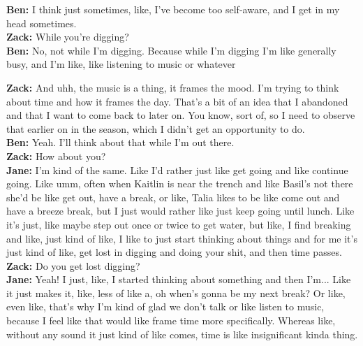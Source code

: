 \begin{arefs}
\item\label{A7}
\textbf{Ben:} I think just sometimes, like, I've become too self-aware, and I get in my head sometimes.\\
\textbf{Zack:} While you're digging?\\
\textbf{Ben:} No, not while I'm digging. Because while I'm digging I'm like generally busy, and I'm like, like listening to music or whatever

\item\label{A8}
\textbf{Zack:} And uhh, the music is a thing, it frames the mood. I'm trying to think about time and how it frames the day. That's a bit of an idea that I abandoned and that I want to come back to later on. You know, sort of, so I need to observe that earlier on in the season, which I didn't get an opportunity to do.\\
\textbf{Ben:} Yeah. I'll think about that while I'm out there.\\
\textbf{Zack:} How about you?\\
\textbf{Jane:} I'm kind of the same. Like I'd rather just like get going and like continue going. Like umm, often when Kaitlin is near the trench and like Basil's not there she'd be like get out, have a break, or like, Talia likes to be like come out and have a breeze break, but I just would rather like just keep going until lunch. Like it's just, like maybe step out once or twice to get water, but like, I find breaking and like, just kind of like, I like to just start thinking about things and for me it's just kind of like, get lost in digging and doing your shit, and then time passes.\\
\textbf{Zack:} Do you get lost digging?\\
\textbf{Jane:} Yeah! I just, like, I started thinking about something and then I'm... Like it just makes it, like, less of like a, oh when's gonna be my next break? Or like, even like, that's why I'm kind of glad we don't talk or like listen to music, because I feel like that would like frame time more specifically. Whereas like, without any sound it just kind of like comes, time is like insignificant kinda thing.


\end{arefs}
